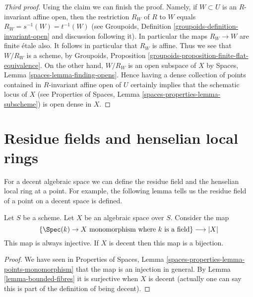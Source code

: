 \begin{proof}[Third proof]
\medskip\noindent
Using the claim we can finish the proof. Namely, if $W \subset U$ is
an $R$-invariant affine open, then the restriction $R_W$ of $R$ to $W$
equals $R_W = s^{-1}(W) = t^{-1}(W)$ (see
Groupoids, Definition \ref{groupoids-definition-invariant-open}
and discussion following it). In particular the maps $R_W \to W$ are
finite \'etale also. It follows in particular that $R_W$ is affine.
Thus we see that $W/R_W$ is a scheme, by
Groupoids, Proposition \ref{groupoids-proposition-finite-flat-equivalence}.
On the other hand, $W/R_W$ is an open subspace of $X$ by
Spaces, Lemma \ref{spaces-lemma-finding-opens}.
Hence having a dense collection of points contained in $R$-invariant
affine open of $U$ certainly implies that the schematic locus of $X$
(see Properties of Spaces, Lemma \ref{spaces-properties-lemma-subscheme})
is open dense in $X$.
\end{proof}













\section{Residue fields and henselian local rings}
\label{section-residue-fields-henselian-local-rings}

\noindent
For a decent algebraic space we can define the residue field and the
henselian local ring at a point. For example, the following lemma
tells us the residue field of a point on a decent space is defined.

\begin{lemma}
\label{lemma-decent-points-monomorphism}
Let $S$ be a scheme. Let $X$ be an algebraic space over $S$.
Consider the map
$$
\{\Spec(k) \to X \text{ monomorphism where }k\text{ is a field}\}
\longrightarrow
|X|
$$
This map is always injective. If $X$ is decent then this map
is a bijection.
\end{lemma}

\begin{proof}
We have seen in
Properties of Spaces,
Lemma \ref{spaces-properties-lemma-points-monomorphism}
that the map is an injection in general.
By Lemma \ref{lemma-bounded-fibres} it is surjective when $X$ is
decent (actually one can say this is part of the definition
of being decent).
\end{proof}

